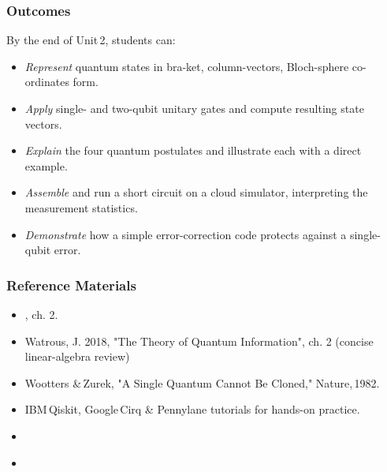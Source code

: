 




\subsubsection{Outcomes}
By the end of Unit 2, students can:
\begin{itemize}
	\item \emph{Represent} quantum states in bra-ket, column-vectors, Bloch-sphere co-ordinates form.
	\item \emph{Apply} single- and two-qubit unitary gates and compute resulting state vectors.
	\item \emph{Explain} the four quantum postulates and illustrate each with a direct example.
	\item \emph{Assemble} and run a short circuit on a cloud simulator, interpreting the measurement statistics.
	\item \emph{Demonstrate} how a simple error-correction code protects against a single-qubit error.	
\end{itemize}

\subsubsection{Reference Materials}
\begin{itemize}
	\item \citeauthor{Nielsen:2010} , ch. 2.
	\item Watrous, J. 2018, "The Theory of Quantum Information", ch. 2 (concise linear-algebra review)
	\item Wootters \& Zurek, "A Single Quantum Cannot Be Cloned," Nature, 1982. %
	\item IBM Qiskit, Google Cirq \& Pennylane tutorials for hands-on practice.
	\item \citeauthor{Abhijith:2022} 
	\item \citeauthor{Ekert:1996} 
\end{itemize}

